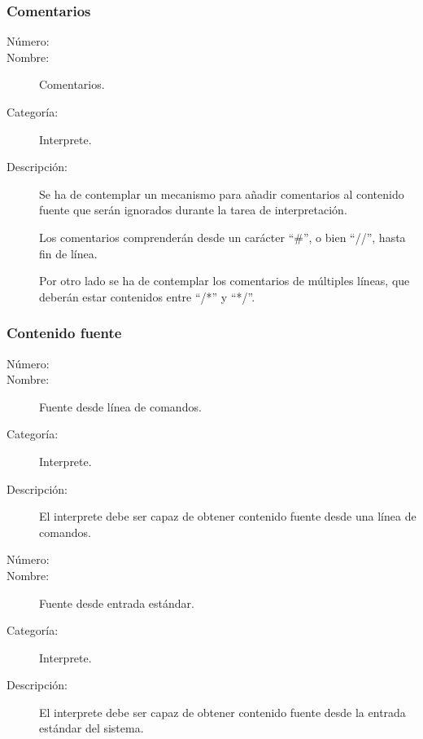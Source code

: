 \subsubsection{Comentarios}
\begin{framed}
	\begin{description}
		\item [Número:] \cn
		\item [Nombre:] Comentarios.
		\item [Categoría:] Interprete.
		\item [Descripción:] Se ha de contemplar un mecanismo para añadir comentarios al contenido fuente que serán ignorados
		durante la tarea de interpretación. 
      
      Los comentarios comprenderán desde un carácter ``\#'', o bien ``//'', hasta fin de línea.
      
      Por otro lado se ha de contemplar los comentarios de múltiples líneas, que deberán estar contenidos entre ``/*'' y ``*/''.
	\end{description}
\end{framed}

\subsubsection{Contenido fuente}
\begin{framed}
	\begin{description}
		\item [Número:] \cn
		\item [Nombre:] Fuente desde línea de comandos.
		\item [Categoría:] Interprete.
		\item [Descripción:] El interprete debe ser capaz de obtener contenido fuente desde una línea de comandos.
	\end {description}
\end{framed}

\begin{framed}
	\begin{description}
		\item [Número:] \cn
		\item [Nombre:] Fuente desde entrada estándar.
		\item [Categoría:] Interprete.
		\item [Descripción:] El interprete debe ser capaz de obtener contenido fuente desde la entrada estándar del sistema.
	\end {description}
\end{framed}

